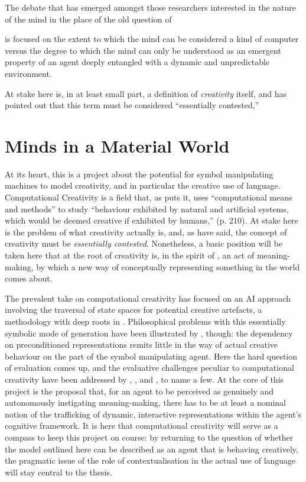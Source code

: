 The debate that has emerged amongst those researchers interested in the nature of the mind in the place of the old question of 

is focused on the extent to which the mind can be considered a kind of computer versus the degree to which the mind can only be understood as an emergent property of an agent deeply entangled with a dynamic and unpredictable environment.

At stake here is, in at least small part, a definition of \emph{creativity} itself, and \cite{Colton} has pointed out that this term must be considered ``essentially contested,''

\section{Minds in a Material World}


At its heart, this is a project about the potential for symbol manipulating machines to model creativity, and in particular the creative use of language.  Computational Creativity is a field that, as \cite{Wiggins2006b} puts it, uses ``computational means and methods'' to study ``behaviour exhibited by natural and artificial systems, which would be deemed creative if exhibited by humans,'' (p. 210).  At stake here is the problem of what creativity actually is, and, as \cite{Colton} have said, the concept of creativity must be \emph{essentially contested}.  Nonetheless, a basic position will be taken here that at the root of creativity is, in the spirit of \cite{Wittgenstein1953}, an act of meaning-making, by which a new way of conceptually representing something in the world comes about.

The prevalent take on computational creativity has focused on an AI approach involving the traversal of state spaces for potential creative artefacts, a methodology with deep roots in \cite{Boden1990}.  Philosophical problems with this essentially symbolic mode of generation have been illustrated by \cite{McGregorEA2014}, though: the dependency on preconditioned representations remits little in the way of actual creative behaviour on the part of the symbol manipulating agent.  Here the hard question of evaluation comes up, and the evaluative challenges peculiar to computational creativity have been addressed by \cite{Ritchie2007}, \cite{ColtonEA2012B}, and \cite{Jordanous2012}, to name a few.  At the core of this project is the proposal that, for an agent to be perceived as genuinely and autonomously instigating meaning-making, there has to be at least a nominal notion of the trafficking of dynamic, interactive representations within the agent's cognitive framework.  It is here that computational creativity will serve as a compass to keep this project on course: by returning to the question of whether the model outlined here can be described as an agent that is behaving creatively, the pragmatic issue of the role of contextualisation in the actual use of language will stay central to the thesis.

